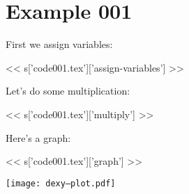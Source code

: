 
\section{Example 001}

First we assign variables:

<< s['code001.tex']['assign-variables'] >>

Let's do some multiplication:

<< s['code001.tex']['multiply'] >>

Here's a graph:

<< s['code001.tex']['graph'] >>

\texttt{[image: dexy--plot.pdf]}

